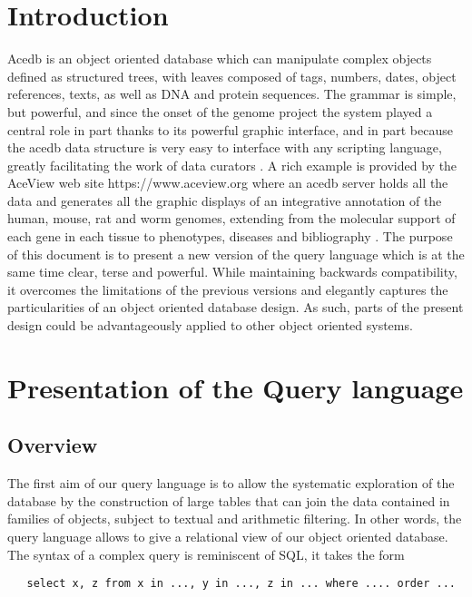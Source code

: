 \documentclass[11pt]{article}
\newcommand{\BL}{\begin{lstlisting}}
\begin{document}
\newpage
\tableofcontents
\newpage

%%%%%%%%%%%%%%%%%%%%%%%%%%%%%%%%%%%%%%%%%%%%%%%%%%%%%%%%%%%%%%%%
% SECTION
%%%%%%%%%%%%%%%%%%%%%%%%%%%%%%%%%%%%%%%%%%%%%%%%%%%%%%%%%%%%%%%%
\section{Introduction}
Acedb \cite{[1]} is an object oriented database which can manipulate complex objects defined as structured trees, 
with leaves composed of tags, numbers, dates, object references, texts, as well as DNA and protein sequences. 
The grammar is simple, but powerful, and since the onset of the genome project the system played a central role in part thanks to
its powerful graphic interface, and in part because the acedb data structure is very easy to interface
with any scripting language, greatly facilitating the work of data curators \cite{[2]}. A rich example is provided by the  AceView 
web site https://www.aceview.org where an acedb server holds all the data
and generates all the graphic displays of an integrative annotation of the human, mouse, rat and worm genomes,
extending from the molecular support of each gene in each tissue to phenotypes, diseases and bibliography \cite{[3]} . 
The purpose of this document is to present a new version of the query language
which is at the same time clear, terse and powerful. While maintaining backwards
compatibility, it overcomes the limitations of the previous versions and elegantly
captures the particularities of an object oriented database design. As such, parts of the present
design could be advantageously applied to other object oriented systems.
\label{sec1}


%%%%%%%%%%%%%%%%%%%%%%%%%%%%%%%%%%%%%%%%%%%%%%%%%%%%%%%%%%%%%%%%
% SECTION
%%%%%%%%%%%%%%%%%%%%%%%%%%%%%%%%%%%%%%%%%%%%%%%%%%%%%%%%%%%%%%%%
\section{Presentation of the Query language}
\subsection{Overview}

The first aim of our query language is to allow the systematic exploration of the database
by the construction of large tables that can join the data contained in families of objects,
subject to textual and arithmetic filtering. In other words, the query language
allows to give a relational view of our object oriented database. 
The syntax of a complex query is reminiscent of SQL, it takes the form
\BL
   select x, z from x in ..., y in ..., z in ... where .... order ...
\end{lstlisting}
\end{document}
